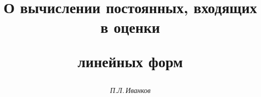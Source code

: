 

 


%  


 


\newcommand{\tts}[1]{} 


 




 


\setcounter{page}{31} 












 


\author{\it П.Л.\,Иванков} 




\title{О вычислении постоянных, входящих в оценки  


линейных форм} 


 


\date{} 




\pagestyle{plain} %


 




\maketitle 


